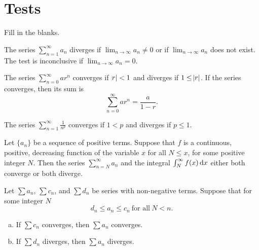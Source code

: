 \documentclass[12pt]{amsart}
\begin{document}
\newpage

\section{Tests}

Fill in the blanks.

\begin{thm}
  The series \(\sum_{n = 1}^\infty a_n\) diverges if \(\lim_{n \to \infty} a_n \neq 0\) or if \(\lim_{n \to \infty} a_n\) does not exist.
  The test is inconclusive if \(\lim_{n \to \infty} a_n = 0\).
\end{thm}

\begin{thm}
  The series \(\sum_{n = 0}^\infty a r^n\) converges if \(\abs{r} < 1\) and diverges if \(1 \leq \abs{r}\).
  If the series converges, then its sum is
  \[\sum_{n = 0}^\infty a r^n = \frac{a}{1 - r}.\]
\end{thm}

\begin{thm}
  The series \(\sum_{n = 1}^\infty \frac{1}{n^p}\) converges if \(1 < p\) and
  diverges if \(p \leq 1\).
\end{thm}

\begin{thm}
  Let \(\{a_n\}\) be a sequence of positive terms.
  Suppose that \(f\) is a continuous, positive, decreasing function of the variable \(x\) for all \(N \leq x\), for some positive integer \(N\).
  Then the series \(\sum_{n = N}^\infty a_n\) and the integral \(\int_N^\infty f(x)\dif x\) either both converge or both diverge.
\end{thm}

\begin{thm}
  Let \(\sum a_n\), \(\sum c_n\), and \(\sum d_n\) be series with non-negative terms.
  Suppose that for some integer \(N\)
  \[d_n \leq a_n \leq c_n\ \text{for all}\ N < n.\]
  \begin{enumerate}[(a)]
  \item
    If \(\sum c_n\) converges, then \(\sum a_n\) converges.
  \item
    If \(\sum d_n\) diverges, then \(\sum a_n\) diverges.
  \end{enumerate}
\end{thm}
\end{document}
